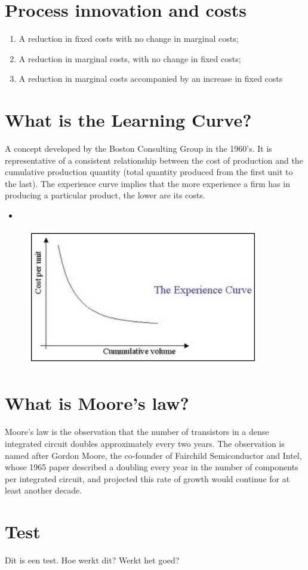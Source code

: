 \section{Process innovation and costs}
\begin{enumerate}
\item A reduction in fixed costs with no change in marginal costs;
\item A reduction in marginal costs, with no change in fixed costs;
\item A reduction in marginal costs accompanied by an increase in fixed costs
\end{enumerate}

\section{What is the Learning Curve?}
A concept developed by the Boston Consulting Group in the 1960's. It is representative of a consistent relationship between the cost of production and the cumulative production quantity (total quantity produced from the first unit to the last). The experience curve implies that the more experience a firm has in producing a particular product, the lower are its costs.

\begin{itemize}
\item 
\end{itemize}

\begin{figure}[h]
\begin{center}
\includegraphics{LearningCurve}
\end{center}
\end{figure}

\section{What is Moore's law?}
Moore's law is the observation that the number of transistors in a dense integrated circuit doubles approximately every two years. The observation is named after Gordon Moore, the co-founder of Fairchild Semiconductor and Intel, whose 1965 paper described a doubling every year in the number of components per integrated circuit, and projected this rate of growth would continue for at least another decade.

\section{Test}
Dit is een test. Hoe werkt dit? Werkt het goed?





